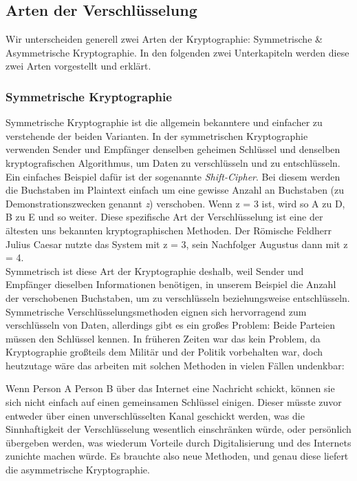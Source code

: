 \documentclass[12pt]{article}
\begin{document}
\subsection{Arten der Verschlüsselung}

Wir unterscheiden generell zwei Arten der Kryptographie: Symmetrische \& Asymmetrische Kryptographie. In den folgenden zwei Unterkapiteln werden diese zwei Arten vorgestellt und erklärt.

\subsubsection{Symmetrische Kryptographie}

Symmetrische Kryptographie ist die allgemein bekanntere und einfacher zu verstehende der beiden Varianten. In der symmetrischen Kryptographie verwenden Sender und Empfänger denselben geheimen Schlüssel und denselben kryptografischen Algorithmus, um Daten zu verschlüsseln und zu entschlüsseln. \\

Ein einfaches Beispiel dafür ist der sogenannte \textit{Shift-Cipher}. Bei diesem werden die Buchstaben im Plaintext einfach um eine gewisse Anzahl an Buchstaben (zu Demonstrationszwecken genannt \textit{z}) verschoben. Wenn z = 3 ist, wird so A zu D, B zu E und so weiter. Diese spezifische Art der Verschlüsselung ist eine der ältesten uns bekannten kryptographischen Methoden. Der Römische Feldherr Julius Caesar nutzte das System mit z = 3, sein Nachfolger Augustus dann mit z = 4. \cite{Uhl2022Krypto} \\

Symmetrisch ist diese Art der Kryptographie deshalb, weil Sender und Empfänger dieselben Informationen benötigen, in unserem Beispiel die Anzahl der verschobenen Buchstaben, um zu verschlüsseln beziehungsweise entschlüsseln. \\

Symmetrische Verschlüsselungsmethoden eignen sich hervorragend zum verschlüsseln von Daten, allerdings gibt es ein großes Problem: Beide Parteien müssen den Schlüssel kennen. In früheren Zeiten war das kein Problem, da Kryptographie großteils dem Militär und der Politik vorbehalten war, doch heutzutage wäre das arbeiten mit solchen Methoden in vielen Fällen undenkbar:

Wenn Person A Person B über das Internet eine Nachricht schickt, können sie sich nicht einfach auf einen gemeinsamen Schlüssel einigen. Dieser müsste zuvor entweder über einen unverschlüsselten Kanal geschickt werden, was die Sinnhaftigkeit der Verschlüsselung wesentlich einschränken würde, oder persönlich übergeben werden, was wiederum Vorteile durch Digitalisierung und des Internets zunichte machen würde. Es brauchte also neue Methoden, und genau diese liefert die asymmetrische Kryptographie. \cite{mavroeidis2018impact}
\end{document}
